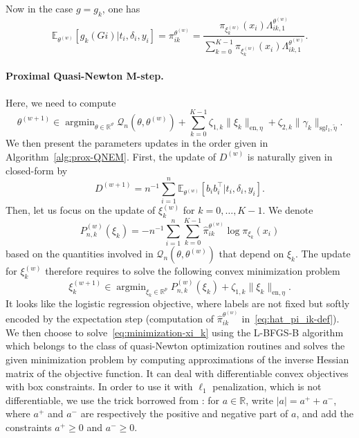 \documentclass[11pt]{article}
\DeclareMathOperator{\argmin}{argmin}
\newcommand{\norm}[1]{\|#1\|}
\newcommand{\cQ}{\mathcal Q}
\newcommand{\R}{\mathds R}
\newcommand{\E}{\mathds E}
\begin{document}
Now in the case $g = g_k$, one has
\begin{equation}
\label{eq:hat_pi_ik-def}
  \E_{\theta^{(w)}}[g_k(Gi) | t_i, \delta_i, y_i] = \pi_{ik}^{\theta^{(w)}} = \dfrac{\pi_{\xi_k^{(w)}}(x_i) \Lambda_{ik,1}^{\theta^{(w)}}}{\sum_{k=0}^{K-1} \pi_{\xi_k^{(w)}}(x_i) \Lambda_{ik,1}^{\theta^{(w)}}}.
\end{equation}

\paragraph*{Proximal Quasi-Newton M-step.}
Here, we need to compute \[\theta^{(w+1)} \in \argmin_{\theta \in \R^\vartheta} \cQ_n(\theta, \theta^{(w)}) + \sum_{k=0}^{K-1} \zeta_{1,k} \norm{\xi_k}_{\text{en}, \eta} + \zeta_{2,k} \norm{\gamma_k}_{\text{sg} l_1, \tilde{\eta}}.\]
We then present the parameters updates in the order given in Algorithm~\ref{alg:prox-QNEM}.
First, the update of $D^{(w)}$ is naturally given in closed-form by
\begin{equation}
  \label{eq:update_D}
  D^{(w+1)} = n^{-1} \sum_{i=1}^n \E_{\theta^{(w)}}[ b_i b_i^\top | t_i, \delta_i, y_i].
\end{equation}
Then, let us focus on the update of $\xi_k^{(w)}$ for $k=0, \ldots, K-1$. We denote
\[ P^{(w)}_{n, k}(\xi_k) = -n^{-1} \sum_{i=1}^n \sum_{k=0}^{K-1} \hat \pi_{ik}^{\theta^{(w)}} \log \pi_{\xi_k}(x_i) \]
based on the quantities involved in $\cQ_n(\theta, \theta^{(w)})$ that depend on $\xi_k$. The update for $\xi_k^{(w)}$ therefore requires to solve the following convex minimization problem
\begin{equation}
  \label{eq:minimization-xi_k}
  \xi_k^{(w+1)} \in \argmin_{\xi_k \in \R^p} P^{(w)}_{n,k}(\xi_k) + \zeta_{1,k} \norm{\xi_k}_{\text{en}, \eta}.
\end{equation}
It looks like the logistic regression objective, where labels are not fixed but softly encoded by the expectation step (computation of $\hat \pi_{ik}^{\theta^{(w)}}$ in~\eqref{eq:hat_pi_ik-def}). We then choose to solve~\eqref{eq:minimization-xi_k} using the L-BFGS-B algorithm~\citep{zhu1997algorithm} which belongs to the class of quasi-Newton optimization routines and solves the given minimization problem by computing approximations
of the inverse Hessian matrix of the objective function. It can deal with differentiable convex objectives with box constraints.
In order to use it with $\ell_1$ penalization, which is not differentiable, we use the trick borrowed from \citet{andrew2007scalable}: for $a \in \R$, write $|a| = a^+ + a^-$, where $a^+$ and $a^-$ are respectively the positive and negative part of $a$, and add the constraints $a^+ \geq 0$ and $a^- \geq 0$.
\end{document}
